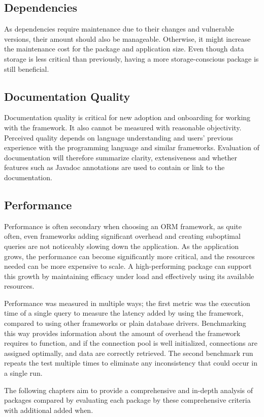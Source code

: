 \subsection{Dependencies}

As dependencies require maintenance due to their changes and vulnerable
versions, their amount should also be manageable. Otherwise, it might increase
the maintenance cost for the package and application size. Even though data
storage is less critical than previously, having a more storage-conscious
package is still beneficial.

\subsection{Documentation Quality}

Documentation quality is critical for new adoption and onboarding for working
with the framework. It also cannot be measured with reasonable objectivity.
Perceived quality depends on language understanding and users’ previous
experience with the programming language and similar frameworks. Evaluation of
documentation will therefore summarize clarity, extensiveness and whether
features such as Javadoc annotations are used to contain or link to the
documentation.

\subsection{Performance}

Performance is often secondary when choosing an ORM framework, as quite often,
even frameworks adding significant overhead and creating suboptimal queries are
not noticeably slowing down the application. As the application grows, the
performance can become significantly more critical, and the resources needed can
be more expensive to scale. A high-performing package can support this growth by
maintaining efficacy under load and effectively using its available resources.

Performance was measured in multiple ways; the first metric was the execution
time of a single query to measure the latency added by using the framework,
compared to using other frameworks or plain database drivers. Benchmarking this
way provides information about the amount of overhead the framework requires to
function, and if the connection pool is well initialized, connections are
assigned optimally, and data are correctly retrieved. The second benchmark run
repeats the test multiple times to eliminate any inconsistency that could occur
in a single run.

The following chapters aim to provide a comprehensive and in-depth analysis of
packages compared by evaluating each package by these comprehensive criteria
with additional added when.